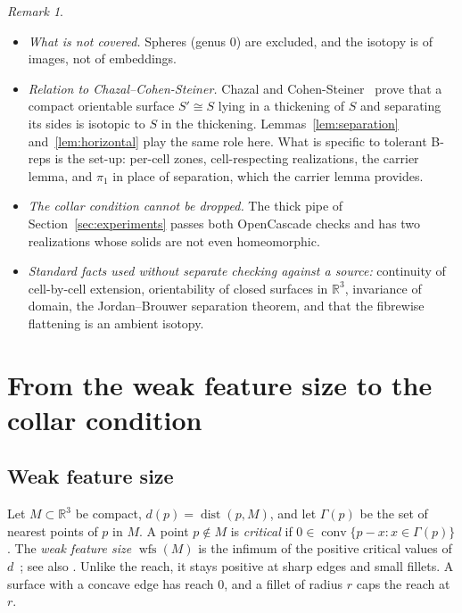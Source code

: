 \documentclass[preprint,12pt]{elsarticle}
\theoremstyle{definition}
\theoremstyle{remark}
\newtheorem{remark}[theorem]{Remark}
\newcommand{\R}{\mathbb{R}}
\newcommand{\wfs}{\operatorname{wfs}}
\newcommand{\dist}{\operatorname{dist}}
\newcommand{\conv}{\operatorname{conv}}
\begin{document}
\begin{remark}
\begin{itemize}
\item \emph{What is not covered.} Spheres (genus 0) are excluded, and the isotopy is of images, not of
embeddings.
\item \emph{Relation to Chazal--Cohen-Steiner.} Chazal and Cohen-Steiner~\cite[Thm.~2.1]{CCS05} prove that a compact
orientable surface $S'\cong S$ lying in a thickening of $S$ and separating its sides is isotopic to $S$ in the
thickening. Lemmas~\ref{lem:separation} and~\ref{lem:horizontal} play the same role here. What is specific to
tolerant B-reps is the set-up: per-cell zones, cell-respecting realizations, the carrier lemma, and $\pi_1$ in place
of separation, which the carrier lemma provides.
\item \emph{The collar condition cannot be dropped.} The thick pipe of Section~\ref{sec:experiments} passes both
OpenCascade checks and has two realizations whose solids are not even homeomorphic.
\item \emph{Standard facts used without separate checking against a source:} continuity of cell-by-cell extension,
orientability of closed surfaces in $\R^3$, invariance of domain, the Jordan--Brouwer separation theorem, and that
the fibrewise flattening is an ambient isotopy.
\end{itemize}
\end{remark}

\section{From the weak feature size to the collar condition}\label{sec:collar}

\subsection{Weak feature size}
Let $M\subset\R^3$ be compact, $d(p)=\dist(p,M)$, and let $\Gamma(p)$ be the set of nearest points of $p$ in $M$.
A point $p\notin M$ is \emph{critical} if $0\in\conv\{p-x:x\in\Gamma(p)\}$. The \emph{weak feature size}
$\wfs(M)$ is the infimum of the positive critical values of $d$~\cite[\S2.2]{CCSL09dcg}; see also
\cite{ChazalLieutier07}. Unlike the reach, it
stays positive at sharp edges and small fillets. A surface with a concave edge has reach $0$, and a fillet of
radius $r$ caps the reach at $r$.
\end{document}
